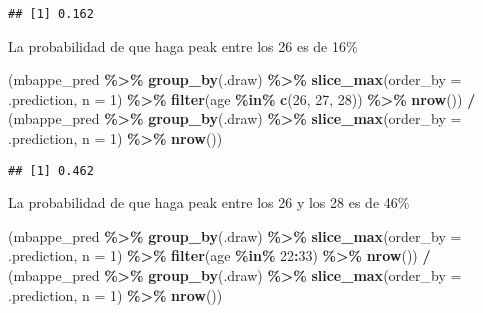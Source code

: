 \documentclass[
]{article}
\newenvironment{Shaded}{\begin{snugshade}}{\end{snugshade}}
\newcommand{\AttributeTok}[1]{\textcolor[rgb]{0.13,0.29,0.53}{#1}}
\newcommand{\DecValTok}[1]{\textcolor[rgb]{0.00,0.00,0.81}{#1}}
\newcommand{\FunctionTok}[1]{\textcolor[rgb]{0.13,0.29,0.53}{\textbf{#1}}}
\newcommand{\NormalTok}[1]{#1}
\newcommand{\SpecialCharTok}[1]{\textcolor[rgb]{0.81,0.36,0.00}{\textbf{#1}}}
\begin{document}
\begin{verbatim}
## [1] 0.162
\end{verbatim}

La probabilidad de que haga peak entre los 26 es de 16\%

\begin{Shaded}
\begin{Highlighting}[]
\NormalTok{(mbappe\_pred }\SpecialCharTok{\%\textgreater{}\%}
  \FunctionTok{group\_by}\NormalTok{(.draw) }\SpecialCharTok{\%\textgreater{}\%}
  \FunctionTok{slice\_max}\NormalTok{(}\AttributeTok{order\_by =}\NormalTok{ .prediction, }\AttributeTok{n =} \DecValTok{1}\NormalTok{) }\SpecialCharTok{\%\textgreater{}\%}
  \FunctionTok{filter}\NormalTok{(age }\SpecialCharTok{\%in\%} \FunctionTok{c}\NormalTok{(}\DecValTok{26}\NormalTok{, }\DecValTok{27}\NormalTok{, }\DecValTok{28}\NormalTok{)) }\SpecialCharTok{\%\textgreater{}\%}
  \FunctionTok{nrow}\NormalTok{()) }\SpecialCharTok{/} 
\NormalTok{  (mbappe\_pred }\SpecialCharTok{\%\textgreater{}\%}
  \FunctionTok{group\_by}\NormalTok{(.draw) }\SpecialCharTok{\%\textgreater{}\%}
  \FunctionTok{slice\_max}\NormalTok{(}\AttributeTok{order\_by =}\NormalTok{ .prediction, }\AttributeTok{n =} \DecValTok{1}\NormalTok{) }\SpecialCharTok{\%\textgreater{}\%}
  \FunctionTok{nrow}\NormalTok{())}
\end{Highlighting}
\end{Shaded}

\begin{verbatim}
## [1] 0.462
\end{verbatim}

La probabilidad de que haga peak entre los 26 y los 28 es de 46\%

\begin{Shaded}
\begin{Highlighting}[]
\NormalTok{(mbappe\_pred }\SpecialCharTok{\%\textgreater{}\%}
  \FunctionTok{group\_by}\NormalTok{(.draw) }\SpecialCharTok{\%\textgreater{}\%}
  \FunctionTok{slice\_max}\NormalTok{(}\AttributeTok{order\_by =}\NormalTok{ .prediction, }\AttributeTok{n =} \DecValTok{1}\NormalTok{) }\SpecialCharTok{\%\textgreater{}\%}
  \FunctionTok{filter}\NormalTok{(age }\SpecialCharTok{\%in\%} \DecValTok{22}\SpecialCharTok{:}\DecValTok{33}\NormalTok{) }\SpecialCharTok{\%\textgreater{}\%}
  \FunctionTok{nrow}\NormalTok{()) }\SpecialCharTok{/} 
\NormalTok{  (mbappe\_pred }\SpecialCharTok{\%\textgreater{}\%}
  \FunctionTok{group\_by}\NormalTok{(.draw) }\SpecialCharTok{\%\textgreater{}\%}
  \FunctionTok{slice\_max}\NormalTok{(}\AttributeTok{order\_by =}\NormalTok{ .prediction, }\AttributeTok{n =} \DecValTok{1}\NormalTok{) }\SpecialCharTok{\%\textgreater{}\%}
  \FunctionTok{nrow}\NormalTok{())}
\end{Highlighting}
\end{Shaded}
\end{document}
